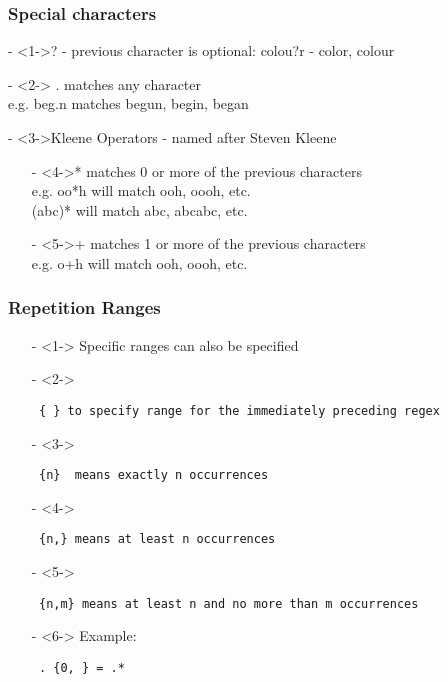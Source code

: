 \documentclass[compress, black]{beamer}
\begin{document}
\begin{frame}[fragile]
	\frametitle{Special characters}
	\begin{large_enum}
	\item[-]<1->? - previous character is optional: colou?r - color, colour
	\item[-]<2-> . matches any character\\
				  e.g. beg.n matches begun, begin, began
	\item[-]<3->Kleene Operators - named after Steven Kleene
			\begin{enumerate}
			\item[-]<4->*  matches 0 or more of the previous characters\\
						e.g. oo*h will match ooh, oooh, etc.\\
						(abc)* will match abc, abcabc, etc.
			\item[-]<5->+  matches 1 or more of the previous characters\\
						e.g. o+h will match ooh, oooh, etc. 
			\end{enumerate}
	\end{large_enum}
\end{frame}

\begin{frame}[fragile]
	\frametitle{Repetition Ranges}
	\begin{enumerate}
	\item[-]<1-> Specific ranges can also be specified
	\item[-]<2-> \small \begin{verbatim} { } to specify range for the immediately preceding regex \end{verbatim}
	\item[-]<3-> \begin{verbatim} {n}  means exactly n occurrences \end{verbatim}
	\item[-]<4-> \begin{verbatim} {n,} means at least n occurrences \end{verbatim}
	\item[-]<5-> \begin{verbatim} {n,m} means at least n and no more than m occurrences \end{verbatim}
	\item[-]<6-> Example: \begin{verbatim} . {0, } = .* \end{verbatim}	
	\end{enumerate}
\end{frame}
\end{document}
